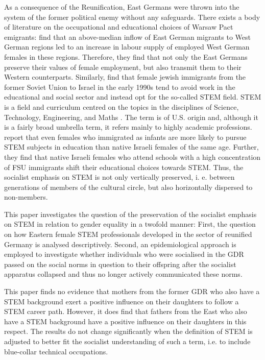 \documentclass[a4paper, oneside, hyperfootnotes = false]{article}
\begin{document}
{As a consequence of the Reunification, East Germans were thrown into the system of the former political enemy without any safeguards.
There exists a body of literature on the occupational and educational choices of Warsaw Pact emigrants:
\cite{Jessen2023} find that an above-median inflow of East German migrants to West German regions led to an increase in labour supply of employed West German females in these regions.
Therefore, they find that not only the East Germans preserve their values of female employment, but also transmit them to their Western counterparts.
Similarly, \cite{FriedmanSokuler2020} find that female jewish immigrants from the former Soviet Union to Israel in the early 1990s tend to avoid work in the educational and social sector and instead opt for the so-called STEM field.
STEM is a field and curriculum centred on the topics in the disciplines of Science, Technology, Engineering, and Maths \citep{Hallinen2024}.
The term is of U.S. origin and, although it is a fairly broad umbrella term, it refers mainly to highly academic professions.
\cite{FriedmanSokuler2020} report that even females who immigrated as infants are more likely to pursue STEM subjects in education than native Israeli females of the same age.
Further, they find that native Israeli females who attend schools with a high concentration of FSU immigrants shift their educational choices towards STEM.
Thus, the socialist emphasis on STEM is not only vertically preserved, i. e. between generations of members of the cultural circle, but also horizontally dispersed to non-members.

This paper investigates the question of the preservation of the socialist emphasis on STEM in relation to gender equality in a twofold manner:
First, the question on how Eastern female STEM professionals developed in the sector of reunified Germany is analysed descriptively.
Second, an epidemiological approach is employed to investigate whether individuals who were socialised in the GDR passed on the social norms in question to their offspring after the socialist apparatus collapsed and thus no longer actively communicated these norms.

This paper finds no evidence that mothers from the former GDR who also have a STEM background exert a positive influence on their daughters to follow a STEM career path.
However, it does find that fathers from the East who also have a STEM background have a positive influence on their daughters in this respect.
The results do not change significantly when the definition of STEM is adjusted to better fit the socialist understanding of such a term, i.e. to include blue-collar technical occupations.

}
\end{document}
